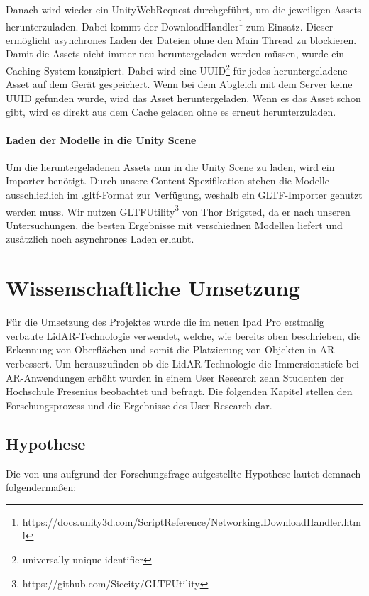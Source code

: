\documentclass[titlepage, a4paper, 11pt]{scrartcl}
\begin{document}
  Danach wird wieder ein UnityWebRequest durchgeführt, um die jeweiligen Assets herunterzuladen. Dabei kommt der DownloadHandler\footnote{https://docs.unity3d.com/ScriptReference/Networking.DownloadHandler.html}
  zum Einsatz. Dieser ermöglicht asynchrones Laden der Dateien ohne den Main Thread zu blockieren.
  Damit die Assets nicht immer neu heruntergeladen werden müssen, wurde ein Caching System konzipiert. Dabei wird eine UUID\footnote{universally unique identifier} für jedes heruntergeladene Asset auf dem Gerät gespeichert. Wenn bei dem Abgleich mit dem Server keine UUID gefunden wurde, wird das Asset heruntergeladen.
  Wenn es das Asset schon gibt, wird es direkt aus dem Cache geladen ohne es erneut herunterzuladen.

  \paragraph{Laden der Modelle in die Unity Scene}
  Um die heruntergeladenen Assets nun in die Unity Scene zu laden, wird ein Importer benötigt. Durch unsere Content-Spezifikation stehen die Modelle ausschließlich im .gltf-Format zur Verfügung, weshalb ein GLTF-Importer genutzt werden muss.
  Wir nutzen GLTFUtility\footnote{https://github.com/Siccity/GLTFUtility} von Thor Brigsted, da er nach unseren Untersuchungen, die besten Ergebnisse mit verschiednen Modellen liefert und zusätzlich noch asynchrones Laden erlaubt.

  \section{Wissenschaftliche Umsetzung}
  Für die Umsetzung des Projektes wurde die im neuen Ipad Pro erstmalig verbaute LidAR-Technologie verwendet, welche, wie bereits oben beschrieben, die Erkennung von Oberflächen und somit die Platzierung von Objekten in AR verbessert. Um herauszufinden ob die LidAR-Technologie die Immersionstiefe bei AR-Anwendungen erhöht wurden in einem User Research zehn Studenten der Hochschule Fresenius beobachtet und befragt. Die folgenden Kapitel stellen den Forschungsprozess und die Ergebnisse des User Research dar.
  \subsection{Hypothese}
    Die von uns aufgrund der Forschungsfrage aufgestellte Hypothese lautet demnach folgendermaßen:\\
\end{document}
